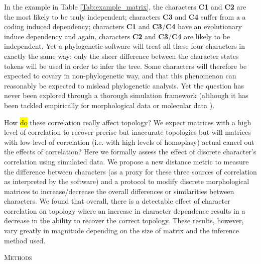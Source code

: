 \documentclass[12pt,letterpaper]{article}
\renewcommand{\section}[1]{%
\bigskip
\begin{center}
\begin{Large}
\normalfont\scshape #1
\medskip
\end{Large}
\end{center}}
\begin{document}
In the example in Table \ref{Tab:example_matrix}, the characters \textbf{C1} and \textbf{C2} are the most likely to be truly independent; characters \textbf{C3} and \textbf{C4} suffer from a a coding induced dependency; characters \textbf{C1} and \textbf{C3}/\textbf{C4} have an evolutionary induce dependency and again, characters \textbf{C2} and \textbf{C3}/\textbf{C4} are likely to be independent.
Yet a phylogenetic software will treat all these four characters in exactly the same way: only the sheer difference between the character states tokens will be used in order to infer the tree.
Some characters will therefore be expected to covary in non-phylogenetic way, and that this phenomenon can reasonably be expected to mislead phylogenetic analysis.
Yet the question has never been explored through a thorough simulation framework (although it has been tackled empirically for morphological data \citealt{Davalos01072014} or molecular data \citealt{ZouConvergence}).

How \hl{do} these correlation really affect topology?
We expect matrices with a high level of correlation to recover precise but inaccurate topologies but will matrices with low level of correlation (i.e. with high levels of homoplasy) actual cancel out the effects of correlation?
Here we formally assess the effect of discrete character's correlation using simulated data.
We propose a new distance metric to measure the difference between characters (as a proxy for these three sources of correlation as interpreted by the software) and a protocol to modify discrete morphological matrices to increase/decrease the overall differences or similarities between characters.
We found that overall, there is a detectable effect of character correlation on topology where an increase in character dependence results in a decrease in the ability to recover the correct topology.
These results, however, vary greatly in magnitude depending on the size of matrix and the inference method used.

\section{Methods}
\end{document}

